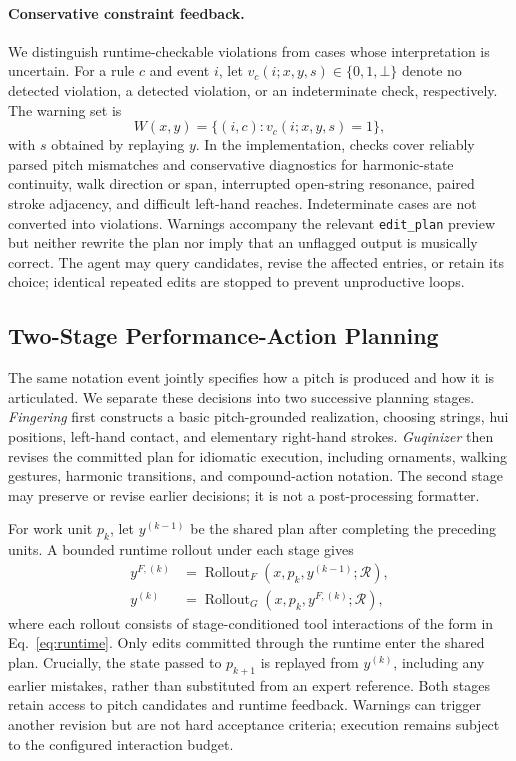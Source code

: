 \documentclass[11pt]{article}
\begin{document}
\paragraph{Conservative constraint feedback.}
We distinguish runtime-checkable violations from cases whose interpretation is uncertain. For a rule $c$ and event $i$, let $v_c(i;x,y,s)\in\{0,1,\bot\}$ denote no detected violation, a detected violation, or an indeterminate check, respectively. The warning set is
\begin{equation}
    W(x,y)=\{(i,c):v_c(i;x,y,s)=1\},
    \label{eq:warnings}
\end{equation}
with $s$ obtained by replaying $y$. In the implementation, checks cover reliably parsed pitch mismatches and conservative diagnostics for harmonic-state continuity, walk direction or span, interrupted open-string resonance, paired stroke adjacency, and difficult left-hand reaches. Indeterminate cases are not converted into violations. Warnings accompany the relevant \texttt{edit\_plan} preview but neither rewrite the plan nor imply that an unflagged output is musically correct. The agent may query candidates, revise the affected entries, or retain its choice; identical repeated edits are stopped to prevent unproductive loops.

\subsection{Two-Stage Performance-Action Planning}\label{sec:two-stage}
The same notation event jointly specifies how a pitch is produced and how it is articulated. We separate these decisions into two successive planning stages. \emph{Fingering} first constructs a basic pitch-grounded realization, choosing strings, hui positions, left-hand contact, and elementary right-hand strokes. \emph{Guqinizer} then revises the committed plan for idiomatic execution, including ornaments, walking gestures, harmonic transitions, and compound-action notation. The second stage may preserve or revise earlier decisions; it is not a post-processing formatter.

For work unit $p_k$, let $y^{(k-1)}$ be the shared plan after completing the preceding units. A bounded runtime rollout under each stage gives
\begin{equation}
\begin{aligned}
    y^{F,(k)}&=\operatorname{Rollout}_{F}(x,p_k,y^{(k-1)};\mathcal{R}),\\
    y^{(k)}&=\operatorname{Rollout}_{G}(x,p_k,y^{F,(k)};\mathcal{R}),
\end{aligned}
\label{eq:stage-composition}
\end{equation}
where each rollout consists of stage-conditioned tool interactions of the form in Eq.~\eqref{eq:runtime}. Only edits committed through the runtime enter the shared plan. Crucially, the state passed to $p_{k+1}$ is replayed from $y^{(k)}$, including any earlier mistakes, rather than substituted from an expert reference. Both stages retain access to pitch candidates and runtime feedback. Warnings can trigger another revision but are not hard acceptance criteria; execution remains subject to the configured interaction budget.
\end{document}
